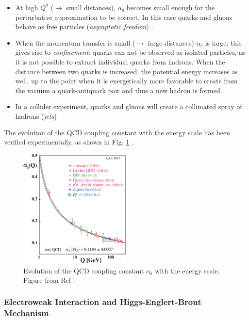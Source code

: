 \begin{itemize}
\item At high $Q^2$ ($\rightarrow$ small distances), $\alpha_\mathrm{s}$ becomes small enough for the perturbative approximation to be correct. In this case quarks and gluons behave as free particles (\textit{asymptotic freedom}) \cite{PhysRevLett.30.1343}\cite{PhysRevLett.30.1346}.
\item When the momentum transfer is small ($\rightarrow$ large distances) $\alpha_\mathrm{s}$ is large; this gives rise to \textit{confinement}: quarks can not be observed as isolated particles, as it is not possible to extract individual quarks from hadrons. When the distance between two quarks is increased, the potential energy increases as well, up to the point when it is energetically more favorable to create from the vacuum a quark-antiquark pair and thus a new hadron is formed.
\item In a collider experiment, quarks and gluons will create a collimated spray of hadrons (\textit{jets})
\end{itemize}

The evolution of the QCD coupling constant with the energy scale has been verified experimentally, as shown in Fig. \ref{fig:sm:alphas} \cite{Bethke:2012jm}.

\begin{figure}[ht]
\centering
\includegraphics[width=0.5\textwidth]{figures/theory/asq-2011}
\caption{Evolution of the QCD coupling constant $\alpha_\mathrm{s}$ with the energy scale. Figure from Ref \cite{Bethke:2012jm}.}
\label{fig:sm:alphas}
\end{figure}

\subsubsection{Electroweak Interaction and Higgs-Englert-Brout Mechanism}
\label{sec:smsusy:ew}

